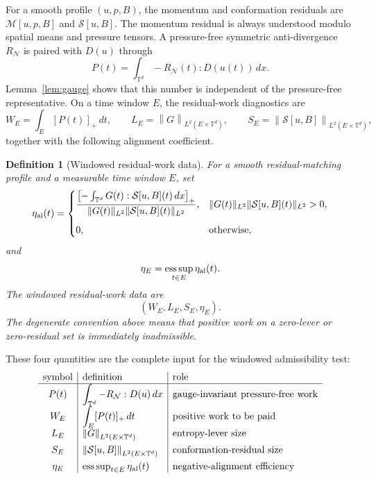 \documentclass[11pt]{article}
\numberwithin{equation}{section}
\newtheorem{definition}[theorem]{Definition}
\newcommand{\T}{\mathbb T}
\newcommand{\calM}{\mathcal M}
\newcommand{\calN}{\mathcal N}
\newcommand{\norm}[1]{\left\lVert #1\right\rVert}
\begin{document}
For a smooth profile \((u,p,B)\), the momentum and conformation residuals are
\(\calM[u,p,B]\) and \(\mathcal S[u,B]\).  The momentum residual is always
understood modulo spatial means and pressure tensors.  A pressure-free
symmetric anti-divergence \(R_{\calN}\) is paired with \(D(u)\) through
\[
  P(t)=\int_{\T^d}-R_{\calN}(t):D(u(t))\,dx .
\]
Lemma~\ref{lem:gauge} shows that this number is independent of the
pressure-free representative.  On a time window \(E\), the residual-work
diagnostics are
\[
  W_E=\int_E[P(t)]_+\,dt,
  \qquad
  L_E=\norm{G}_{L^2(E\times\T^d)},
  \qquad
  S_E=\norm{\mathcal S[u,B]}_{L^2(E\times\T^d)},
\]
together with the following alignment coefficient.

\begin{definition}[Windowed residual-work data]
\label{def:windowed-data}
For a smooth residual-matching profile and a measurable time window \(E\), set
\[
  \eta_{\rm al}(t)=
  \begin{cases}
  \displaystyle
  \frac{\left[-\int_{\T^d}G(t):\mathcal S[u,B](t)\,dx\right]_+}
       {\|G(t)\|_{L^2}\|\mathcal S[u,B](t)\|_{L^2}},
  & \|G(t)\|_{L^2}\|\mathcal S[u,B](t)\|_{L^2}>0,\\[1.2em]
  0, & \text{otherwise},
  \end{cases}
\]
and
\[
  \eta_E=\operatorname*{ess\,sup}_{t\in E}\eta_{\rm al}(t).
\]
The windowed residual-work data are
\[
  (W_E,L_E,S_E,\eta_E).
\]
The degenerate convention above means that positive work on a zero-lever or
zero-residual set is immediately inadmissible.
\end{definition}

These four quantities are the complete input for the windowed admissibility
test:
\[
\begin{array}{c|l|l}
\hbox{symbol} & \hbox{definition} & \hbox{role}\\ \hline
P(t) & \displaystyle\int_{\T^d}-R_{\calN}:D(u)\,dx
& \hbox{gauge-invariant pressure-free work}\\[0.5em]
W_E & \displaystyle\int_E[P(t)]_+\,dt
& \hbox{positive work to be paid}\\[0.5em]
L_E & \norm{G}_{L^2(E\times\T^d)}
& \hbox{entropy-lever size}\\[0.5em]
S_E & \norm{\mathcal S[u,B]}_{L^2(E\times\T^d)}
& \hbox{conformation-residual size}\\[0.5em]
\eta_E & \operatorname*{ess\,sup}_{t\in E}\eta_{\mathrm{al}}(t)
& \hbox{negative-alignment efficiency}
\end{array}
\]
\end{document}
